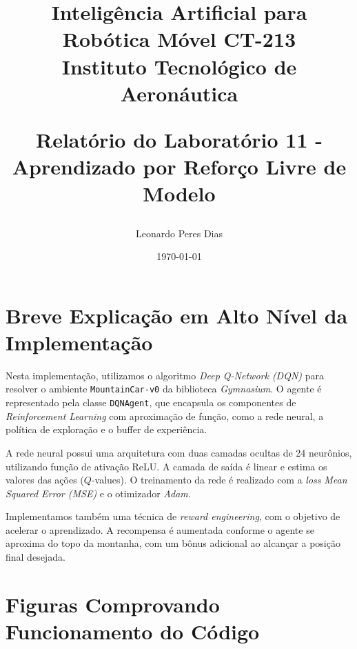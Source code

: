 \documentclass[a4paper,12pt]{article}
\title{
    \textbf{Inteligência Artificial para Robótica Móvel CT-213}\\
    \Large Instituto Tecnológico de Aeronáutica 

    \textbf{Relatório do Laboratório 11 -  Aprendizado por Reforço Livre de Modelo}\\
}
\author{
    Leonardo Peres Dias 
}
\date{\today}
\begin{document}
\BgThispage
\maketitle
\thispagestyle{empty} %


\newpage
\NoBgThispage %

\tableofcontents

\newpage
\NoBgThispage %

\section{Breve Explicação em Alto Nível da Implementação}

Nesta implementação, utilizamos o algoritmo \textit{Deep Q-Network (DQN)} para resolver o ambiente \texttt{MountainCar-v0} da biblioteca \textit{Gymnasium}. O agente é representado pela classe \texttt{DQNAgent}, que encapsula os componentes de \textit{Reinforcement Learning} com aproximação de função, como a rede neural, a política de exploração e o buffer de experiência.

A rede neural possui uma arquitetura com duas camadas ocultas de 24 neurônios, utilizando função de ativação ReLU. A camada de saída é linear e estima os valores das ações ($Q$-values). O treinamento da rede é realizado com a \textit{loss} \textit{Mean Squared Error (MSE)} e o otimizador \textit{Adam}.

Implementamos também uma técnica de \textit{reward engineering}, com o objetivo de acelerar o aprendizado. A recompensa é aumentada conforme o agente se aproxima do topo da montanha, com um bônus adicional ao alcançar a posição final desejada.

\section{Figuras Comprovando Funcionamento do Código}
\end{document}

